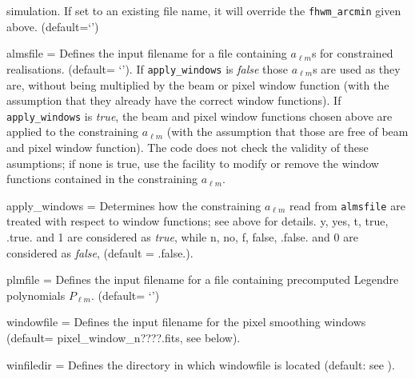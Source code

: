 \begin{qualifiers}
\begin{qulistwide}{}
    simulation. If set to an existing file name, it will override the
    {\tt fhwm\_arcmin} given above. (default=`')
%
     \item[{almsfile = }]%
 Defines the input filename for a file
    containing $a_{\ell m}$s for constrained realisations. 
(default= `'). If {\tt apply\_windows} is {\em false} 
those $a_{\ell m}$s are used as they are, without being multiplied
by the beam or pixel window function (with the assumption that they already have the
    correct window functions). If {\tt apply\_windows} is {\em true}, the beam and
    pixel window functions chosen above are applied to the constraining $a_{\ell m}$ (with the
    assumption that those are free of beam and pixel window function). The code
    does not check the validity of these asumptions; if none is true, use the
     facility to modify or remove
    the window functions contained in the constraining $a_{\ell m}$.
%
     \item[{apply\_windows = }]%
  Determines how the constraining $a_{\ell m}$  read from
     {\tt almsfile} are
     treated with respect to window functions; see above for details. 
     y, yes, t, true, .true. and 1 are considered as {\em true}, while n, no, f,
     false, .false. and 0 are considered as {\em false}, (default = .false.).
%
     \item[{plmfile = }]%
 Defines the input  filename for a file
    containing  precomputed Legendre polynomials $P_{\ell m}$.
(default= `')
%
     \item[{windowfile = }]%
 Defines the input filename  for the pixel
    smoothing windows 
(default= pixel\_window\_n????.fits, see below).
%
     \item[{winfiledir = }]%
  Defines the directory in which windowfile
    is located (default: see 
%
).
  \end{qulistwide}
\end{qualifiers}

